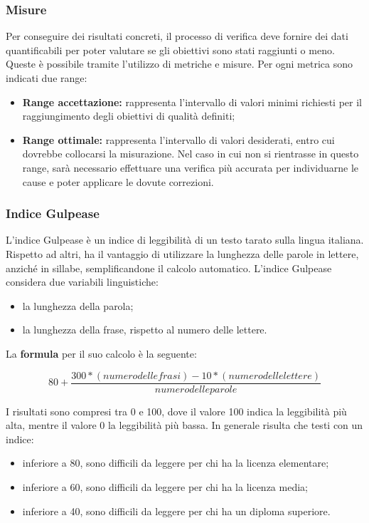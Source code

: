 		\subsubsection{Misure}
		Per conseguire dei risultati concreti, il processo di verifica deve fornire dei dati quantificabili per poter valutare se gli obiettivi sono stati raggiunti o meno. Queste è possibile tramite l’utilizzo di metriche e misure. Per ogni metrica sono indicati due range:
		\begin{itemize}
			\item \textbf{Range accettazione:} rappresenta l'intervallo di valori minimi richiesti per il raggiungimento degli obiettivi di qualità definiti;
			\item \textbf{Range ottimale:} rappresenta l'intervallo di valori desiderati, entro cui dovrebbe collocarsi la misurazione. Nel caso in cui non si rientrasse in questo range, sarà necessario effettuare una verifica più accurata per individuarne le cause e poter applicare le dovute correzioni.
		\end{itemize}
	
		\subsubsection{Indice Gulpease}
		L'indice Gulpease è un indice di leggibilità di un testo tarato sulla lingua italiana. Rispetto ad altri, ha il vantaggio di utilizzare la lunghezza delle parole in lettere, anziché in sillabe, semplificandone il calcolo automatico. L'indice Gulpease considera due variabili linguistiche:
		\begin{itemize}
			\item la lunghezza della parola;
			\item la lunghezza della frase, rispetto al numero delle lettere.
		\end{itemize}
		La \textbf{formula} per il suo calcolo è la seguente:
		
		\[ 80+\frac{300*(numero delle frasi)-10*(numero delle lettere)}{numero delle parole} \]
		
		I risultati sono compresi tra 0 e 100, dove il valore 100 indica la leggibilità più alta, mentre il valore 0 la leggibilità più bassa. In generale risulta che testi con un indice:
		\begin{itemize}
			\item inferiore a 80, sono difficili da leggere per chi ha la licenza elementare;
			\item inferiore a 60, sono difficili da leggere per chi ha la licenza media;
			\item inferiore a 40, sono difficili da leggere per chi ha un diploma superiore.
		\end{itemize}
		
